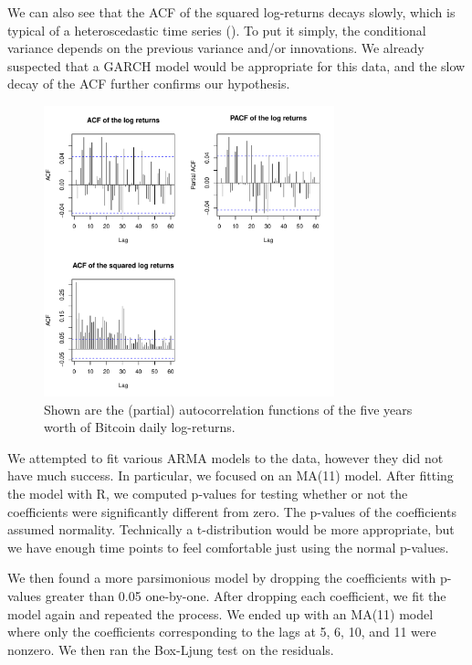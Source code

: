\documentclass[12pt]{article}
\begin{document}
We can also see that the ACF of the squared log-returns decays slowly, which is typical of a heteroscedastic time series (). To put it simply, the conditional variance depends on the previous variance and/or innovations. We already suspected that a GARCH model would be appropriate for this data, and the slow decay of the ACF further confirms our hypothesis.

\begin{figure}[h]
    \centering
    \includegraphics[width=0.75\textwidth]{log_ret_acfs.pdf}
    \caption{Shown are the (partial) autocorrelation functions of the five years worth of Bitcoin daily log-returns.}
    \label{fig:log_ret_acfs}
\end{figure}

We attempted to fit various ARMA models to the data, however they did not have much success. In particular, we focused on an MA(11) model. After fitting the model with R, we computed p-values for testing whether or not the coefficients were significantly different from zero. The p-values of the coefficients assumed normality. Technically a t-distribution would be more appropriate, but we have enough time points to feel comfortable just using the normal p-values.

We then found a more parsimonious model by dropping the coefficients with p-values greater than 0.05 one-by-one. After dropping each coefficient, we fit the model again and repeated the process. We ended up with an MA(11) model where only the coefficients corresponding to the lags at 5, 6, 10, and 11 were nonzero. We then ran the Box-Ljung test on the residuals.
\end{document}
